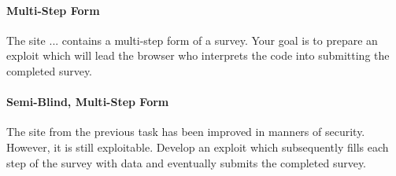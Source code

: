 \documentclass{./handout}
\begin{document}

\begin{subtask}
\paragraph{Multi-Step Form}
The site ... contains a multi-step form of a survey. Your goal is to
prepare an exploit which will lead the browser who interprets the code
into submitting the completed survey.
\end{subtask}

\begin{subtask}
\paragraph{Semi-Blind, Multi-Step Form}
The site from the previous task has been improved in manners of security. 
However, it is still exploitable.
Develop an exploit which subsequently fills each step of the survey with 
data and eventually submits the completed survey.
\end{subtask}
\end{document}
